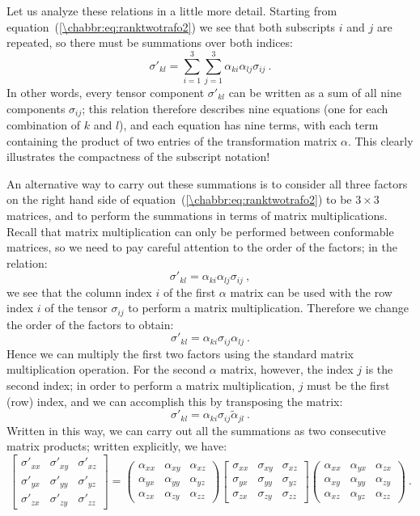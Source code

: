 Let us analyze these relations in a little more detail.  Starting from equation~(\ref{\chabbr:eq:ranktwotrafo2}) we see that both subscripts $i$ and $j$ are repeated, so there must be summations over both indices:
\[
	\sigma'_{kl} = \sum_{i=1}^3\sum_{j=1}^3\alpha_{ki}\alpha_{lj} \sigma_{ij}\ .
\]
In other words, every tensor component $\sigma'_{kl}$ can be written as a sum of all nine components $\sigma_{ij}$; this relation therefore describes nine equations (one for each combination of $k$ and $l$), and each equation has nine terms, with each term containing the product of two entries of the transformation matrix $\alpha$.  This clearly illustrates the compactness of the subscript notation!

An alternative way to carry out these summations is to consider all three factors on the right hand side of equation~(\ref{\chabbr:eq:ranktwotrafo2}) to be $3\times 3$ matrices, and to perform the summations in terms of matrix multiplications.  Recall that matrix multiplication can only be performed between conformable matrices, so we need to pay careful attention to the order of the factors; in the relation:
\[
	\sigma'_{kl} = \alpha_{ki}\alpha_{lj} \sigma_{ij}\ ,
\]
we see that the column index $i$ of the first $\alpha$ matrix can be used with the row index $i$ of the tensor $\sigma_{ij}$ to perform a matrix multiplication. Therefore we change the order of the factors to obtain:
\[
	\sigma'_{kl} = \alpha_{ki}\sigma_{ij}\alpha_{lj}\ .
\]
Hence we can multiply the first two factors using the standard matrix multiplication operation.  For the second $\alpha$ matrix, however, the index $j$ is the second index; in order to perform a matrix multiplication, $j$ must be the first (row) index, and we can accomplish this by transposing the matrix:
\[
	\sigma'_{kl} = \alpha_{ki}\sigma_{ij}\tilde{\alpha}_{jl}\ .
\]
Written in this way, we can carry out all the summations as two consecutive matrix products; written explicitly, we have:
\[
	\begin{bmatrix}\sigma'_{xx}&\sigma'_{xy}&\sigma'_{xz}\\ \sigma'_{yx}&\sigma'_{yy}&\sigma'_{yz}\\ \sigma'_{zx}&\sigma'_{zy}&\sigma'_{zz}\end{bmatrix}=
	\begin{pmatrix}\alpha_{xx}&\alpha_{xy}&\alpha_{xz}\\ \alpha_{yx}&\alpha_{yy}&\alpha_{yz}\\ \alpha_{zx}&\alpha_{zy}&\alpha_{zz}\end{pmatrix}
	\begin{bmatrix}\sigma_{xx}&\sigma_{xy}&\sigma_{xz}\\ \sigma_{yx}&\sigma_{yy}&\sigma_{yz}\\ \sigma_{zx}&\sigma_{zy}& \sigma_{zz}\end{bmatrix}
	\begin{pmatrix}\alpha_{xx}&\alpha_{yx}&\alpha_{zx}\\ \alpha_{xy}&\alpha_{yy}&\alpha_{zy}\\ \alpha_{xz}&\alpha_{yz}&\alpha_{zz}\end{pmatrix}\ .
\]
